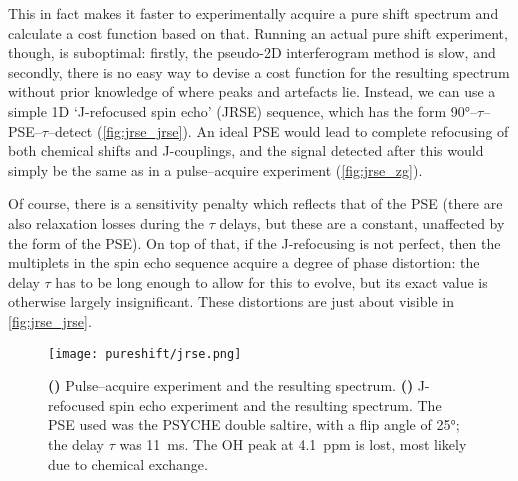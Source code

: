 This in fact makes it faster to experimentally acquire a pure shift spectrum and calculate a cost function based on that.
Running an actual pure shift experiment, though, is suboptimal: firstly, the pseudo-2D interferogram method is slow, and secondly, there is no easy way to devise a cost function for the resulting spectrum without prior knowledge of where peaks and artefacts lie.
Instead, we can use a simple 1D `J-refocused spin echo' (JRSE) sequence, which has the form \ang{90}--$\tau$--PSE--$\tau$--detect (\cref{fig:jrse_jrse}).
An ideal PSE would lead to complete refocusing of both chemical shifts and J-couplings, and the signal detected after this would simply be the same as in a pulse--acquire experiment (\cref{fig:jrse_zg}).

Of course, there is a sensitivity penalty which reflects that of the PSE (there are also relaxation losses during the $\tau$ delays, but these are a constant, unaffected by the form of the PSE).
On top of that, if the J-refocusing is not perfect, then the multiplets in the spin echo sequence acquire a degree of phase distortion: the delay $\tau$ has to be long enough to allow for this to evolve, but its exact value is otherwise largely insignificant.
These distortions are just about visible in \cref{fig:jrse_jrse}.

\begin{figure}[htbp]
    \centering
    \texttt{[image: pureshift/jrse.png]}%
    {\label{fig:jrse_zg}}%
    {\label{fig:jrse_jrse}}%
    \caption[J-refocused spin echo experiment]{
        \textbf{()} Pulse--acquire experiment and the resulting spectrum.
        \textbf{()} J-refocused spin echo experiment and the resulting spectrum.
        The PSE used was the PSYCHE double saltire, with a flip angle of \ang{25}; the delay $\tau$ was \qty{11}{\ms}.
        The OH peak at \qty{4.1}{ppm} is lost, most likely due to chemical exchange.
    }
    \label{fig:jrse}
\end{figure}

